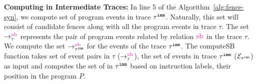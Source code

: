 
\noindent\textbf{Computing \lsb in Intermediate Traces:} 
In line 5 of the Algorithm~\ref{alg:fence-syn}, we compute set of program 
events in trace $ {\tau}^{\mathtt{imm}} $. Naturally, this set will consist of 
candidate fences along with all the program events in trace $ \tau $.
The set $ \setSB $ represents the pair of program events related by 
relation $ \lsb $ in the trace $ \tau $. We compute the set 
$ \seqb{\imm{\tau}}{}{} $ for the events of the trace $ {\tau}^{\mathtt{imm}} $. 
The computeSB function takes set of \lsb event pairs in $ \tau $ 
($ \setSB $), the set of events in trace $ {\tau}^{\mathtt{imm}} $ 
($ \mathcal{E}_{{\tau}^{\mathtt{imm}}} $) as input and computes the set of \lsb in 
$ {\tau}^{\mathtt{imm}} $ based on instruction labels, their position in the program $ P $. 

